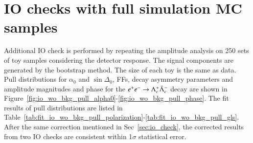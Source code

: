 \clearpage
\section{IO checks with full simulation MC samples}
\label{app:IO_results}

Additional IO check is performed by repeating the amplitude analysis on 250 sets of toy samples considering the detector response. The signal components are generated by the bootstrap method. The size of each toy is the same as data. Pull distributions for $\alpha_0$ and $\sin\Delta_0$, FFs, decay asymmetry parameters and amplitude magnitudes and phase for the $e^+e^-\rightarrow\Lambda_{c}^{+}\bar{\Lambda}_{c}^{-}$ decay are shown in Figure~\ref{fig:io_wo_bkg_pull_alpha0}-\ref{fig:io_wo_bkg_pull_phase}. The fit results of pull distributions are listed in Table~\ref{tab:fit_io_wo_bkg_pull_polarization}-\ref{tab:fit_io_wo_bkg_pull_gls}. After the same correction mentioned in Sec~\ref{sec:io_check}, the corrected results from two IO checks are consistent within 1$\sigma$ statistical error.

